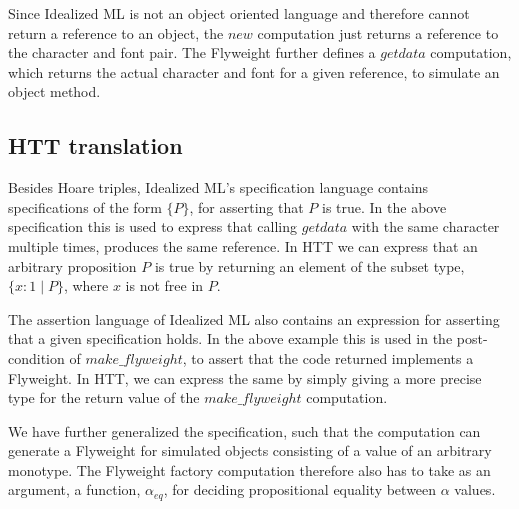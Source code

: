\documentclass[a4paper,english]{article}
\begin{document}
Since Idealized ML is not an object oriented language and therefore cannot
return a reference to an object, the $new$ computation just returns a reference
to the character and font pair. The Flyweight further defines a $getdata$
computation, which returns the actual character and font for a given reference,
to simulate an object method.

\subsection{HTT translation}

Besides Hoare triples, Idealized ML's specification language contains
specifications of the form $\{ P \}$, for asserting that $P$ is true. In the
above specification this is used to express that calling $getdata$ with the
same character multiple times, produces the same reference. In HTT we can
express that an arbitrary proposition $P$ is true by returning an element of
the subset type, $\{ x : 1 \mid P \}$, where $x$ is not free in $P$. 

The assertion language of Idealized ML also contains an expression for
asserting that a given specification holds. In the above example this is used
in the post-condition of $make\_flyweight$, to assert that the code returned
implements a Flyweight. In HTT, we can express the same by simply giving a more
precise type for the return value of the $make\_flyweight$ computation. 

We have further generalized the specification, such that the computation can
generate a Flyweight for simulated objects consisting of a value of an
arbitrary monotype. The Flyweight factory computation therefore also has to
take as an argument, a function, $\alpha_{eq}$, for deciding propositional
equality between $\alpha$ values. 
\end{document}
